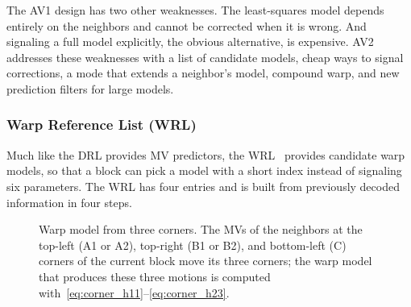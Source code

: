 \documentclass[journal]{IEEEtran}
\begin{document}
The AV1 design has two other weaknesses. The least-squares model depends
entirely on the neighbors and cannot be corrected when it is wrong. And
signaling a full model explicitly, the obvious alternative, is expensive. AV2
addresses these weaknesses with a list of candidate models, cheap ways to
signal corrections, a mode that extends a neighbor's model, compound warp, and
new prediction filters for large models.

\subsubsection{Warp Reference List (WRL)}
\label{sec:wrl}
Much like the DRL provides MV predictors, the WRL~\cite{cwgC061} provides candidate warp
models, so that a block can pick a model with a short index instead of
signaling six parameters. The WRL has four entries and is built from
previously decoded information in four steps.

\begin{figure}[t]
  \centering
  \caption{Warp model from three corners. The MVs of the neighbors at the
  top-left (A1 or A2), top-right (B1 or B2), and bottom-left (C) corners of
  the current block move its three corners; the warp model that produces
  these three motions is computed with~\eqref{eq:corner_h11}--\eqref{eq:corner_h23}.}
  \label{fig:warp_corner}
\end{figure}
\end{document}
